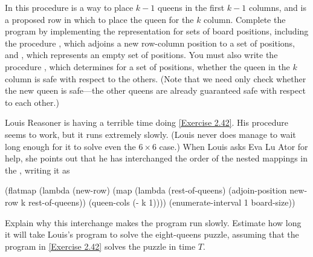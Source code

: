 \begin{exercise}
	In this procedure  is a way to place \( k - 1 \) queens in the first \( k - 1 \) columns, and  is a proposed row in which to place the queen for the \( k \) column.
	Complete the program by implementing the representation for sets of board positions, including the procedure , which adjoins a new row-column position to a set of positions, and , which represents an empty set of positions.
	You must also write the procedure , which determines for a set of positions, whether the queen in the \( k \) column is safe with respect to the others.
	(Note that we need only check whether the new queen is safe---the other queens are already guaranteed safe with respect to each other.)
\end{exercise}



\begin{exercise}
	\label{Exercise 2.43}
	Louis Reasoner is having a terrible time doing \cref{Exercise 2.42}.
	His  procedure seems to work, but it runs extremely slowly.
	(Louis never does manage to wait long enough for it to solve even the \( 6 × 6 \) case.)
	When Louis asks Eva Lu Ator for help, she points out that he has interchanged the order of the nested mappings in the , writing it as
	\begin{scheme}
	  (flatmap
	   (lambda (new-row)
	     (map (lambda (rest-of-queens)
	            (adjoin-position new-row
	                             k
	                             rest-of-queens))
	          (queen-cols (- k 1))))
	   (enumerate-interval 1 board-size))
	\end{scheme}
	Explain why this interchange makes the program run slowly.
	Estimate how long it will take Louis’s program to solve the eight-queens puzzle, assuming that the program in \cref{Exercise 2.42} solves the puzzle in time \( T \).
\end{exercise}
